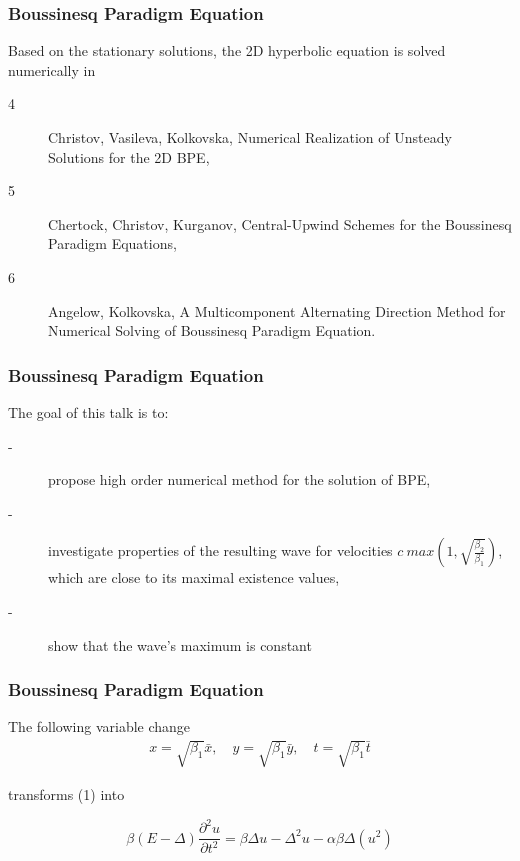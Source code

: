 \documentclass{beamer}
\newcommand{\be}{\begin{equation}}
\newcommand{\ee}{\end{equation}}
\begin{document}

\begin{frame}
\frametitle{Boussinesq Paradigm Equation}


Based on the stationary solutions, the 2D hyperbolic equation is solved numerically in 
\begin{description}
 \item[4] Christov, Vasileva, Kolkovska, Numerical Realization of Unsteady Solutions for the 2D BPE,
 \item[5] Chertock, Christov, Kurganov, Central-Upwind Schemes for the Boussinesq Paradigm Equations, 
  \item[6] Angelow, Kolkovska, A Multicomponent Alternating Direction Method for Numerical Solving of Boussinesq Paradigm Equation.
\end{description}
\end{frame}


\begin{frame}
\frametitle{Boussinesq Paradigm Equation}

The goal of this talk is to:
\begin{description}
 \item[-] propose high order numerical method for the solution of BPE,
 \item[-] investigate properties of the resulting wave for velocities $c ~ max(1, \sqrt{ \frac{\beta_2}{\beta_1} } )$, which are close to its maximal existence values,
 \item[-] show that the wave's maximum is constant
\end{description}
\end{frame}


\begin{frame}
\frametitle{Boussinesq Paradigm Equation}
The following variable change
\begin{align}
x = \sqrt{\beta_1} \bar{x}, \quad y = \sqrt{\beta_1} \bar{y}, \quad t = \sqrt{\beta_1} \bar{t}
\end{align}

transforms (1) into 

\be\label{problem}
\beta(E-\Delta) \frac{\partial^2 u}{\partial t^2}=
 \beta \Delta u -\Delta^2 u -\alpha \beta \Delta (u^2)
\ee

\end{frame}
\end{document}
